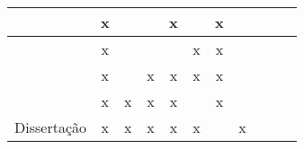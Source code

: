 \begin{table}[]
\begin{tabular}{|c|c|c|c|c|c|c|c|c|c|c|}
    \cite{32.95}   & x         &  ~            & ~     & x     & ~             & x         & ~              \\ \hline
    \cite{12}      & x         &  ~            & ~     & ~     & x             & x         & ~              \\ \hline
    \cite{21}      & x         &  ~            & x     & x     & x             & x         & ~              \\ \hline
    \cite{pca6}    & x         & x             & x     & x     & ~             & x         & ~              \\ \hline
    Dissertação    & x         & x             & x     & x     & x             & ~         & x              \\ \hline
    \end{tabular}\label{table:discussao}
\end{table}

